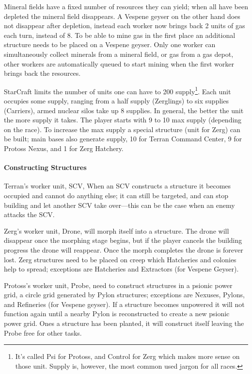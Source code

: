 Mineral fields have a fixed number of resources they can yield; when all have been depleted the mineral field disappears. A Vespene geyser on the other hand does not disappear after depletion, instead each worker now brings back 2 units of gas each turn, instead of 8. To be able to mine gas in the first place an additional structure needs to be placed on a Vespene geyser. Only one worker can simultaneously collect minerals from a mineral field, or gas from a gas depot, other workers are automatically queued to start mining when the first worker brings back the resources.

\label{sec:starcraft_supply}
StarCraft limits the number of units one can have to 200 supply\footnote{It’s called Psi for Protoss, and Control for Zerg which makes more sense on those unit. Supply is, however, the most common used jargon for all races.}. Each unit occupies some supply, ranging from a half supply (Zerglings) to six supplies (Carriers), armed nuclear silos take up 8 supplies. In general, the better the unit the more supply it takes. The player starts with 9 to 10 max supply (depending on the race). To increase the max supply a special structure (unit for Zerg) can be built; main bases also generate supply, 10 for Terran Command Center, 9 for Protoss Nexus, and 1 for Zerg Hatchery.

\paragraph{Constructing Structures}
Terran's worker unit, SCV,  When an SCV constructs a structure it becomes occupied and cannot do anything else; it can still be targeted, and can stop building and let another SCV take over—this can be the case when an enemy attacks the SCV.

Zerg’s worker unit, Drone, will morph itself into a structure. The drone will disappear once the morphing stage begins, but if the player cancels the building progress the drone will reappear. Once the morph completes the drone is forever lost. Zerg structures need to be placed on creep which Hatcheries and colonies help to spread; exceptions are Hatcheries and Extractors (for Vespene Geyser).

Protoss’s worker unit, Probe, need to construct structures in a psionic power grid, a circle grid generated by Pylon structures; exceptions are Nexuses, Pylons, and Refineries (for Vespene geyser). If a structure becomes unpowered it will not function again until a nearby Pylon is reconstructed to create a new psionic power grid. Ones a structure has been planted, it will construct itself leaving the Probe free for other tasks.

